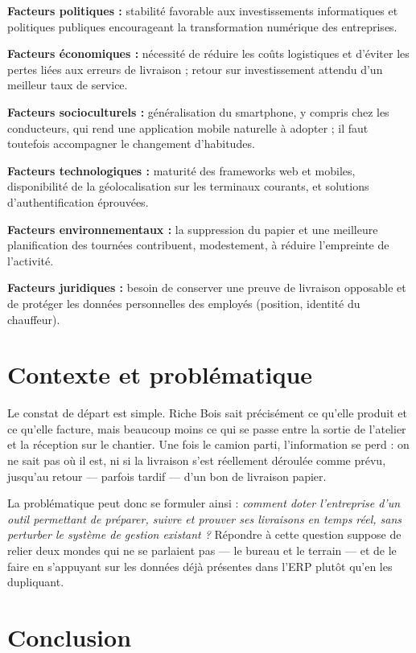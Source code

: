 \documentclass[12pt,a4paper]{report}
\begin{document}
\textbf{Facteurs politiques :} stabilité favorable aux investissements informatiques et politiques publiques encourageant la transformation numérique des entreprises.

\textbf{Facteurs économiques :} nécessité de réduire les coûts logistiques et d'éviter les pertes liées aux erreurs de livraison ; retour sur investissement attendu d'un meilleur taux de service.

\textbf{Facteurs socioculturels :} généralisation du smartphone, y compris chez les conducteurs, qui rend une application mobile naturelle à adopter ; il faut toutefois accompagner le changement d'habitudes.

\textbf{Facteurs technologiques :} maturité des frameworks web et mobiles, disponibilité de la géolocalisation sur les terminaux courants, et solutions d'authentification éprouvées.

\textbf{Facteurs environnementaux :} la suppression du papier et une meilleure planification des tournées contribuent, modestement, à réduire l'empreinte de l'activité.

\textbf{Facteurs juridiques :} besoin de conserver une preuve de livraison opposable et de protéger les données personnelles des employés (position, identité du chauffeur).

\section{Contexte et problématique}

Le constat de départ est simple. Riche Bois sait précisément ce qu'elle produit et ce qu'elle facture, mais beaucoup moins ce qui se passe entre la sortie de l'atelier et la réception sur le chantier. Une fois le camion parti, l'information se perd : on ne sait pas où il est, ni si la livraison s'est réellement déroulée comme prévu, jusqu'au retour — parfois tardif — d'un bon de livraison papier.

La problématique peut donc se formuler ainsi : \textit{comment doter l'entreprise d'un outil permettant de préparer, suivre et prouver ses livraisons en temps réel, sans perturber le système de gestion existant ?} Répondre à cette question suppose de relier deux mondes qui ne se parlaient pas — le bureau et le terrain — et de le faire en s'appuyant sur les données déjà présentes dans l'ERP plutôt qu'en les dupliquant.

\section{Conclusion}
\end{document}

